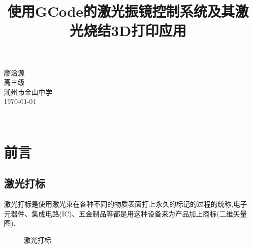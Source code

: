 \documentclass[a4paper,12pt,onecolumn,twoside]{article}
\title{使用GCode的激光振镜控制系统及其激光烧结3D打印应用}
\date{}
\begin{document}
\maketitle
\vspace{5in}
\begin{flushright}
\large{
	廖洽源\\
	高三级\\
	潮州市金山中学\\
	\today
}
\end{flushright}

\thispagestyle{empty} 　　　%
\tableofcontents
\newpage
{} %

\twocolumn
\section{前言}
\subsection{激光打标}
激光打标是使用激光束在各种不同的物质表面打上永久的标记的过程的统称,电子元器件、集成电路(IC)、五金制品等都是用这种设备来为产品加上商标(二维矢量图).
\begin{figure}[ht]
\centering
{}
\caption{激光打标}
\end{figure}
\end{document}
